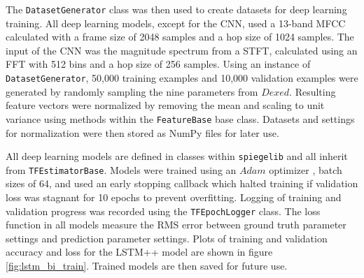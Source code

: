 

The \texttt{DatasetGenerator} class was then used to create datasets for deep learning training. All deep learning models, except for the CNN, used a 13-band MFCC calculated with a frame size of 2048 samples and a hop size of 1024 samples. The input of the CNN was the magnitude spectrum from a STFT, calculated using an FFT with 512 bins and a hop size of 256 samples. Using an instance of \texttt{DatasetGenerator}, 50,000 training examples and 10,000 validation examples were generated by randomly sampling the nine parameters from $Dexed$. Resulting feature vectors were normalized by removing the mean and scaling to unit variance using methods within the \texttt{FeatureBase} base class. Datasets and settings for normalization were then stored as NumPy files for later use.

All deep learning models are defined in classes within \texttt{spiegelib} and all inherit from \texttt{TFEstimatorBase}. Models were trained using an $Adam$ optimizer \cite{kingma2014adam}, batch sizes of 64, and used an early stopping callback which halted training if validation loss was stagnant for 10 epochs to prevent overfitting. Logging of training and validation progress was recorded using the \texttt{TFEpochLogger} class. The loss function in all models measure the RMS error between ground truth parameter settings and prediction parameter settings. 
Plots of training and validation accuracy and loss for the LSTM++ model are shown in figure \ref{fig:lstm_bi_train}. Trained models are then saved for future use.

